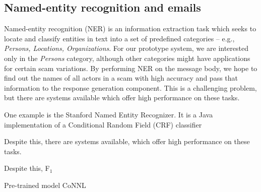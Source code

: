 \subsection{Named-entity recognition and emails}
Named-entity recognition (NER) is an information extraction task which seeks to locate and classify entities in text into a set of predefined categories -- e.g., \textit{Persons, Locations, Organizations}. For our prototype system, we are interested only in the \emph{Persons} category, although other categories might have applications for certain scam variations.  By performing NER on the message body, we hope to find out the names of all actors in a scam with high accuracy and pass that information to the response generation component. This is a challenging problem, but there are systems available which offer high performance on these tasks.

One example is the Stanford Named Entity Recognizer. It is a Java implementation of a Conditional Random Field (CRF) classifier 

Despite this, there are systems available, which offer high performance on these tasks. 


Despite this, F$_{1}$



Pre-trained model
CoNNL